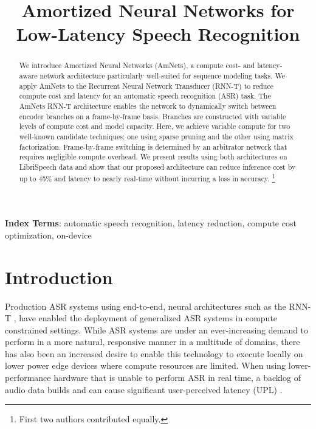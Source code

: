 \documentclass[a4paper]{article}
\title{Amortized Neural Networks for Low-Latency Speech Recognition}
\newcommand\blfootnote[1]{\begingroup
	\renewcommand\thefootnote{}\footnote{#1}\addtocounter{footnote}{-1}\endgroup
}
\begin{document}
\maketitle

\begin{abstract}
We introduce Amortized Neural Networks (AmNets), a compute cost- and latency-aware network architecture particularly well-suited for sequence modeling tasks. 
We apply AmNets to the Recurrent Neural Network Transducer (RNN-T) to reduce compute cost and latency for an automatic speech recognition (ASR) task. 
The AmNets RNN-T architecture enables the network to dynamically switch between encoder branches on a frame-by-frame basis. 
Branches are constructed with variable levels of compute cost and model capacity. 
Here, we achieve variable compute for two well-known candidate techniques: one using sparse pruning and the other using matrix factorization. 
Frame-by-frame switching is determined by an arbitrator network that requires negligible compute overhead. 
We present results using both architectures on LibriSpeech data and show that our proposed architecture can reduce inference cost by up to 45\% and latency to nearly real-time without incurring a loss in accuracy. 
\blfootnote{First two authors contributed equally.}

\end{abstract}
\noindent\textbf{Index Terms}: automatic speech recognition, latency reduction, compute cost optimization, on-device

\section{Introduction}

Production ASR systems using end-to-end, neural architectures such as the RNN-T \cite{Graves2013, Rao2018, Kannan2019}, have enabled the deployment of generalized ASR systems in compute constrained settings. 
While ASR systems are under an ever-increasing demand to perform in a more natural, responsive manner in a multitude of domains, there has also been an increased desire to enable this technology to execute locally on lower power edge devices where compute resources are limited. 
When using lower-performance hardware that is unable to perform ASR in real time, a backlog of audio data builds and can cause significant user-perceived latency (UPL) \cite{Sainath2020}.
\end{document}

